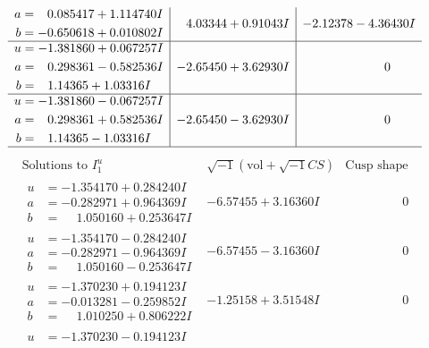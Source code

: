 \documentclass[1p]{elsarticle_modified}
\theoremstyle{definition}
\newcommand{\I}{\sqrt{-1}}
\begin{document}
$$\begin{array}{c|c|c}
\begin{aligned}
a &= \phantom{-}0.085417 + 1.114740 I \\
b &= -0.650618 + 0.010802 I\end{aligned}
 & \phantom{-}4.03344 + 0.91043 I & -2.12378 - 4.36430 I \\ \hline\begin{aligned}
u &= -1.381860 + 0.067257 I \\
a &= \phantom{-}0.298361 - 0.582536 I \\
b &= \phantom{-}1.14365 + 1.03316 I\end{aligned}
 & -2.65450 + 3.62930 I & \phantom{-0.000000 } 0 \\ \hline\begin{aligned}
u &= -1.381860 - 0.067257 I \\
a &= \phantom{-}0.298361 + 0.582536 I \\
b &= \phantom{-}1.14365 - 1.03316 I\end{aligned}
 & -2.65450 - 3.62930 I & \phantom{-0.000000 } 0\\
 \hline 
 \end{array}$$\newpage$$\begin{array}{c|c|c}  
\text{Solutions to }I^u_{1}& \I (\text{vol} + \sqrt{-1}CS) & \text{Cusp shape}\\
 \hline 
\begin{aligned}
u &= -1.354170 + 0.284240 I \\
a &= -0.282971 + 0.964369 I \\
b &= \phantom{-}1.050160 + 0.253647 I\end{aligned}
 & -6.57455 + 3.16360 I & \phantom{-0.000000 } 0 \\ \hline\begin{aligned}
u &= -1.354170 - 0.284240 I \\
a &= -0.282971 - 0.964369 I \\
b &= \phantom{-}1.050160 - 0.253647 I\end{aligned}
 & -6.57455 - 3.16360 I & \phantom{-0.000000 } 0 \\ \hline\begin{aligned}
u &= -1.370230 + 0.194123 I \\
a &= -0.013281 - 0.259852 I \\
b &= \phantom{-}1.010250 + 0.806222 I\end{aligned}
 & -1.25158 + 3.51548 I & \phantom{-0.000000 } 0 \\ \hline\begin{aligned}
u &= -1.370230 - 0.194123 I \\

\end{aligned}
\end{array}$$
\end{document}
